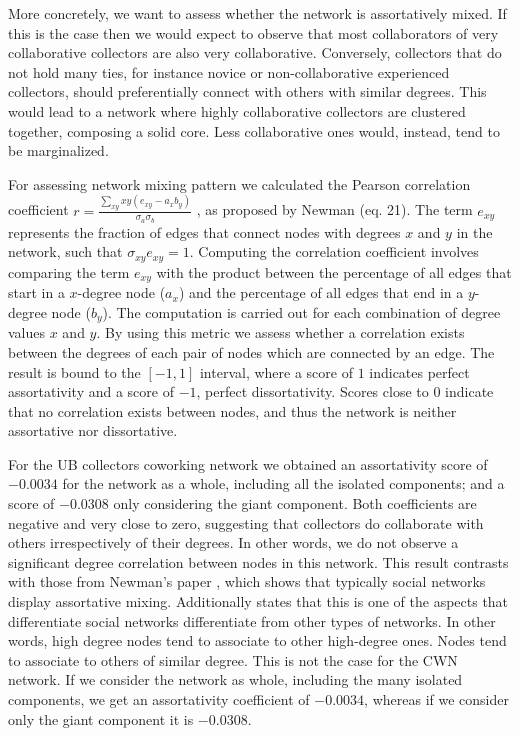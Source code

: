 More concretely, we want to assess whether the network is assortatively mixed.
If this is the case then we would expect to observe that most collaborators of very collaborative collectors are also very collaborative.
Conversely, collectors that do not hold many ties, for instance novice or non-collaborative experienced collectors, should preferentially connect with others with similar degrees.
This would lead to a network where highly collaborative collectors are clustered together, composing a solid core. Less collaborative ones would, instead, tend to be marginalized. %

For assessing network mixing pattern we calculated the Pearson correlation coefficient $r = \frac{\sum_{xy} xy(e_{xy}-a_xb_y)}{\sigma_a \sigma_b}$ , as proposed by Newman \cite{Newman2003c} (eq. 21).
The term $e_{xy}$ represents the fraction of edges that connect nodes with degrees $x$ and $y$ in the network, such that $\sigma_{xy}e_{xy}=1$. 
Computing the correlation coefficient involves comparing the term $e_{xy}$ with the product between the percentage of all edges that start in a $x$-degree node ($a_x$) and the percentage of all edges that end in a $y$-degree node ($b_y$). The computation is carried out for each combination of degree values $x$ and $y$.
By using this metric we assess whether a correlation exists between the degrees of each pair of nodes which are connected by an edge. 
The result is bound to the $[-1,1]$ interval, where a score of $1$ indicates perfect assortativity and a score of $-1$, perfect dissortativity.
Scores close to $0$ indicate that no correlation exists between nodes, and thus the network is neither assortative nor dissortative.

For the UB collectors coworking network we obtained an assortativity score of $-0.0034$ for the network as a whole, including all the isolated components; and a score of $-0.0308$ only considering the giant component.
Both coefficients are negative and very close to zero, suggesting that collectors do collaborate with others irrespectively of their degrees. In other words, we do not observe a significant degree correlation between nodes in this network. 
This result contrasts with those from Newman's paper \cite{Newman2003b}, which shows that typically social networks display assortative mixing. Additionally states that this is one of the aspects that differentiate social networks differentiate from other types of networks. In other words, high degree nodes tend to associate to other high-degree ones. Nodes tend to associate to others of similar degree.
This is not the case for the CWN network. If we consider the network as whole, including the many isolated components, we get an assortativity coefficient of $-0.0034$, whereas if we consider only the giant component it is $-0.0308$. 


